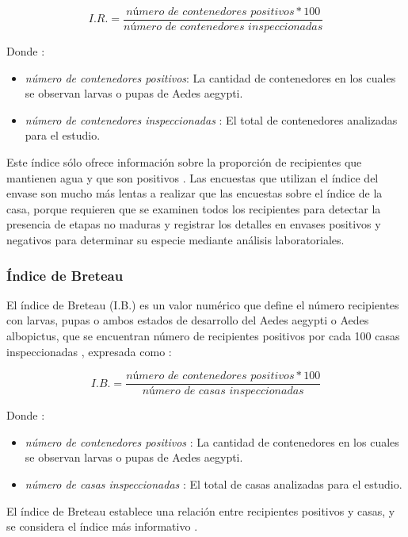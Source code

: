 \begin{equation}
I.R. = \frac{\textit{número de contenedores positivos} * 100}{\textit{número de contenedores inspeccionadas}}
\end{equation}

Donde :
\begin{itemize}
\item \textit{número de contenedores positivos}: La cantidad de contenedores en los cuales se observan larvas o pupas de Aedes aegypti.
\item \textit{número de contenedores inspeccionadas} : El total de contenedores analizadas para el estudio.
\end{itemize}

Este índice sólo ofrece información sobre la proporción de recipientes que mantienen agua y que
son positivos \cite{world2009dengue}. Las encuestas que utilizan el índice del envase son mucho
más lentas a realizar que las encuestas sobre el índice de la casa, porque requieren que se
examinen todos los recipientes para detectar la presencia de etapas no maduras y registrar los
detalles en envases positivos y negativos para determinar su especie mediante análisis
laboratoriales.

\subsubsection{Índice de Breteau}
El índice de Breteau (I.B.) es un valor numérico que define el número recipientes con larvas,
pupas o ambos estados de desarrollo del Aedes aegypti o Aedes albopictus, que se encuentran número
de recipientes positivos por cada 100 casas inspeccionadas
\cite{ibanez1995vectores, MARQUES1993,world2009dengue}, expresada como :

\begin{equation}
I.B. = \frac{\textit{número de contenedores positivos} * 100}{\textit{número de casas inspeccionadas}}
\end{equation}

Donde :
\begin{itemize}
\item \textit{número de contenedores positivos} : La cantidad de contenedores en los cuales se observan larvas o pupas de Aedes aegypti.
\item \textit{número de casas inspeccionadas} : El total de casas analizadas para el estudio.
\end{itemize}

El índice de Breteau establece una relación entre recipientes positivos y casas, y se considera el
índice más informativo \cite{world2009dengue}.

